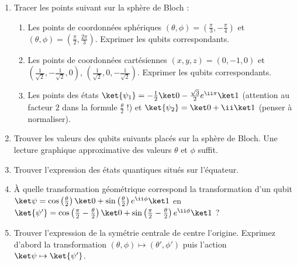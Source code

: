 \documentclass[11pt,class=report,crop=false]{standalone}
\renewcommand{\commentfigure}[1]{#1} %
\begin{document}
\begin{exercicecours}
\sauteligne
\begin{enumerate}
  \item Tracer les points suivant sur la sphère de Bloch :
  \begin{enumerate}
    \item Les points de coordonnées sphériques $(\theta,\phi)=(\frac\pi3,-\frac\pi4)$ et $(\theta,\phi)=(\frac\pi2,\frac{2\pi}{3})$.
    Exprimer les qubits correspondants. 
    
    \item Les points de coordonnées cartésiennes $(x,y,z) = (0,-1,0)$
    et $(\frac{1}{\sqrt2},-\frac{1}{\sqrt2},0)$, $(\frac{1}{\sqrt2},0,-\frac1{\sqrt2})$. Exprimer les qubits correspondants. 
    
    \item Les points des états $\ket{\psi_1} = -\frac12\ket0 - \frac{\sqrt3}{2}e^{\ii\pi}\ket1$ (attention au facteur $2$ dans la formule $\frac\theta2$ !) et    
    $\ket{\psi_2} = \ket0 + \ii\ket1$ (penser à normaliser).
    
  \end{enumerate}
  
  \item Trouver les valeurs des qubits suivants placés sur la sphère de Bloch.
  Une lecture graphique approximative des valeurs $\theta$ et $\phi$ suffit.
  
  \commentfigure{
  \myfigure{0.8}{
  \tikzinput{bloch05a}\qquad\qquad
  \tikzinput{bloch05b}
  } 
  }

  \item Trouver l'expression des états quantiques situés sur l'équateur.
  
  
  \item À quelle transformation géométrique correspond la transformation d'un qubit $\ket\psi = \cos\left(\frac\theta2\right)\ket0+ \sin\left(\frac\theta2\right)e^{\ii\phi}\ket1$
  en $\ket{\psi'} = \cos\left(\frac\pi2-\frac\theta2\right)\ket0+ \sin\left(\frac\pi2-\frac\theta2\right)e^{\ii\phi}\ket1$ ?
  
  \item Trouver l'expression de la symétrie centrale de centre l'origine.
  Exprimez d'abord la transformation $(\theta,\phi) \mapsto (\theta',\phi')$
  puis l'action $\ket\psi \mapsto \ket{\psi'}$.
  
\end{enumerate}
\end{exercicecours}
\end{document}
